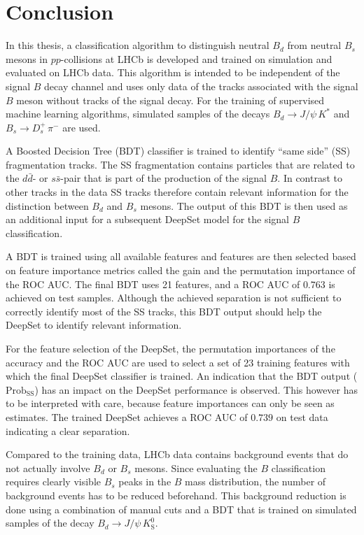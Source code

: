 \chapter{Conclusion}

In this thesis, a classification algorithm to distinguish neutral $B_d$ from neutral $B_s$ mesons in $pp$-collisions at LHCb is developed and trained on simulation and evaluated on LHCb data.
This algorithm is intended to be independent of the signal $B$ decay channel and uses only data of the tracks associated with the signal $B$ meson without tracks of the signal decay.
For the training of supervised machine learning algorithms, simulated samples of the decays $B_d \rightarrow J/\psi \, K^*$ and $B_s \rightarrow D^+_s \, \pi^-$ are used.

A Boosted Decision Tree (BDT) classifier is trained to identify \enquote{same side} (SS) fragmentation tracks.
The SS fragmentation contains particles that are related to the $d\bar{d}$- or $s\bar{s}$-pair that is part of the production of the signal $B$. 
In contrast to other tracks in the data SS tracks therefore contain relevant information for the distinction between $B_d$ and $B_s$ mesons.
The output of this BDT is then used as an additional input for a subsequent DeepSet model for the signal $B$ classification.

A BDT is trained using all available features and features are then selected based on feature importance metrics called the gain and the permutation importance of the ROC AUC. 
The final BDT uses 21 features, and a ROC AUC of $0.763$ is achieved on test samples.
Although the achieved separation is not sufficient to correctly identify most of the SS tracks, this BDT output should help the DeepSet to identify relevant information.

For the feature selection of the DeepSet, the permutation importances of the accuracy and the ROC AUC are used to select a set of 23 training features with which the final DeepSet classifier is trained.
An indication that the BDT output ($\text{Prob}_\text{SS}$) has an impact on the DeepSet performance is observed.
This however has to be interpreted with care, because feature importances can only be seen as estimates.
The trained DeepSet achieves a ROC AUC of $0.739$ on test data indicating a clear separation.

Compared to the training data, LHCb data contains background events that do not actually involve $B_d$ or $B_s$ mesons.
Since evaluating the $B$ classification requires clearly visible $B_s$ peaks in the $B$ mass distribution, the number of background events has to be reduced beforehand.
This background reduction is done using a combination of manual cuts and a BDT that is trained on simulated samples of the decay $B_d \rightarrow J/\psi \, K^0_\text{S}$.

